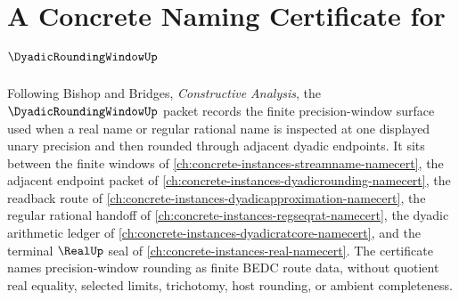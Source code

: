 \chapter{A Concrete Naming Certificate for $\DyadicRoundingWindowUp$}
\label{ch:concrete-instances-dyadicroundingwindow-namecert}

Following Bishop and Bridges, \emph{Constructive Analysis}, the $\DyadicRoundingWindowUp$ packet records the finite precision-window surface used when a real name or regular rational name is inspected at one displayed unary precision and then rounded through adjacent dyadic endpoints. It sits between the finite windows of \autoref{ch:concrete-instances-streamname-namecert}, the adjacent endpoint packet of \autoref{ch:concrete-instances-dyadicrounding-namecert}, the readback route of \autoref{ch:concrete-instances-dyadicapproximation-namecert}, the regular rational handoff of \autoref{ch:concrete-instances-regseqrat-namecert}, the dyadic arithmetic ledger of \autoref{ch:concrete-instances-dyadicratcore-namecert}, and the terminal $\RealUp$ seal of \autoref{ch:concrete-instances-real-namecert}. The certificate names precision-window rounding as finite BEDC route data, without quotient real equality, selected limits, trichotomy, host rounding, or ambient completeness.


